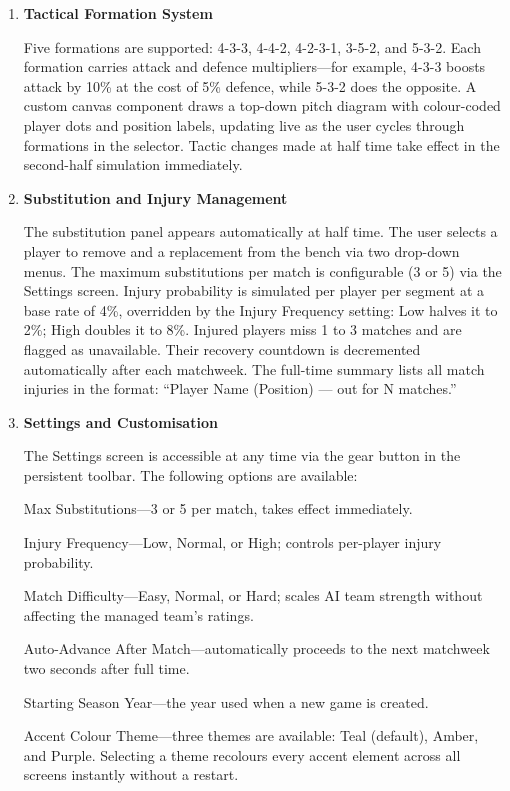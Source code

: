 \documentclass[11pt,a4paper]{article}
\begin{document}
\begin{enumerate}
\item \textbf{Tactical Formation System}

Five formations are supported: 4-3-3, 4-4-2, 4-2-3-1, 3-5-2, and 5-3-2. Each formation carries attack and defence multipliers---for example, 4-3-3 boosts attack by 10\% at the cost of 5\% defence, while 5-3-2 does the opposite. A custom canvas component draws a top-down pitch diagram with colour-coded player dots and position labels, updating live as the user cycles through formations in the selector. Tactic changes made at half time take effect in the second-half simulation immediately.

\item \textbf{Substitution and Injury Management}

The substitution panel appears automatically at half time. The user selects a player to remove and a replacement from the bench via two drop-down menus. The maximum substitutions per match is configurable (3 or 5) via the Settings screen. Injury probability is simulated per player per segment at a base rate of 4\%, overridden by the Injury Frequency setting: Low halves it to 2\%; High doubles it to 8\%. Injured players miss 1 to 3 matches and are flagged as unavailable. Their recovery countdown is decremented automatically after each matchweek. The full-time summary lists all match injuries in the format: ``Player Name (Position) --- out for N matches.''

\item \textbf{Settings and Customisation}

The Settings screen is accessible at any time via the gear button in the persistent toolbar. The following options are available:

Max Substitutions---3 or 5 per match, takes effect immediately.

Injury Frequency---Low, Normal, or High; controls per-player injury probability.

Match Difficulty---Easy, Normal, or Hard; scales AI team strength without affecting the managed team's ratings.

Auto-Advance After Match---automatically proceeds to the next matchweek two seconds after full time.

Starting Season Year---the year used when a new game is created.

Accent Colour Theme---three themes are available: Teal (default), Amber, and Purple. Selecting a theme recolours every accent element across all screens instantly without a restart.


\end{enumerate}
\end{document}
